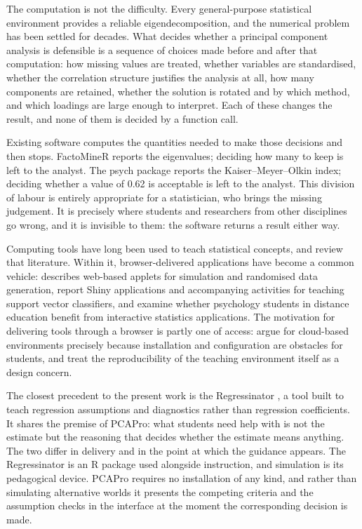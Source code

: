 \documentclass[12pt]{article}
\begin{document}
The computation is not the difficulty. Every general-purpose statistical
environment provides a reliable eigendecomposition, and the numerical problem
has been settled for decades. What decides whether a principal component
analysis is defensible is a sequence of choices made before and after that
computation: how missing values are treated, whether variables are standardised,
whether the correlation structure justifies the analysis at all, how many
components are retained, whether the solution is rotated and by which method,
and which loadings are large enough to interpret. Each of these changes the
result, and none of them is decided by a function call.

Existing software computes the quantities needed to make those decisions and
then stops. FactoMineR \citep{le2008} reports the eigenvalues; deciding how many
to keep is left to the analyst. The psych package \citep{psych} reports the
Kaiser--Meyer--Olkin index; deciding whether a value of 0.62 is acceptable is
left to the analyst. This division of labour is entirely appropriate for a
statistician, who brings the missing judgement. It is precisely where students
and researchers from other disciplines go wrong, and it is invisible to them:
the software returns a result either way.

Computing tools have long been used to teach statistical concepts, and
\citet{zavez2025} review that literature. Within it, browser-delivered
applications have become a common vehicle: \citet{lu2022} describes web-based
applets for simulation and randomised data generation, \citet{wang2023} report
Shiny applications and accompanying activities for teaching support vector
classifiers, and \citet{berkmann2025} examine whether psychology students in
distance education benefit from interactive statistics applications. The
motivation for delivering tools through a browser is partly one of access:
\citet{kim2021} argue for cloud-based environments precisely because
installation and configuration are obstacles for students, and
\citet{dogucu2022} treat the reproducibility of the teaching environment itself
as a design concern.

The closest precedent to the present work is the Regressinator
\citep{reinhart2025}, a tool built to teach regression assumptions and
diagnostics rather than regression coefficients. It shares the premise of
PCAPro: what students need help with is not the estimate but the reasoning that
decides whether the estimate means anything. The two differ in delivery and in
the point at which the guidance appears. The Regressinator is an R package used
alongside instruction, and simulation is its pedagogical device. PCAPro requires
no installation of any kind, and rather than simulating alternative worlds it
presents the competing criteria and the assumption checks in the interface at
the moment the corresponding decision is made.
\end{document}

